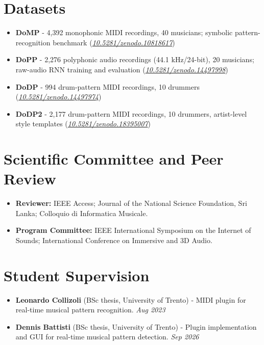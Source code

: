 \documentclass[11pt]{article}
\begin{document}
\section*{Datasets }
\begin{itemize}[leftmargin=1.2em, itemsep=-0.25em]
    \item \textbf{DoMP} - 4,392 monophonic MIDI recordings, 40 musicians; symbolic pattern-recognition benchmark (\href{https://doi.org/10.5281/zenodo.10818617}{\textit{10.5281/zenodo.10818617}})
    \item \textbf{DoPP} - 2,276 polyphonic audio recordings (44.1 kHz/24-bit), 20 musicians; raw-audio RNN training and evaluation (\href{https://doi.org/10.5281/zenodo.14497998}{\textit{10.5281/zenodo.14497998}})
    \item \textbf{DoDP} - 994 drum-pattern MIDI recordings, 10 drummers (\href{https://doi.org/10.5281/zenodo.14497974}{\textit{10.5281/zenodo.14497974}})
    \item \textbf{DoDP2} - 2,177 drum-pattern MIDI recordings, 10 drummers, artist-level style templates (\href{https://doi.org/10.5281/zenodo.18395007}{\textit{10.5281/zenodo.18395007}})
\end{itemize}

\section*{Scientific Committee and Peer Review}
\begin{itemize}[leftmargin=1.2em, itemsep=-0.25em]
    \item \textbf{Reviewer:} IEEE Access; Journal of the National Science Foundation, Sri Lanka; Colloquio di Informatica Musicale.
    \item \textbf{Program Committee:} IEEE International Symposium on the Internet of Sounds; International Conference on Immersive and 3D Audio.
\end{itemize}


\section*{Student Supervision}
\begin{itemize}[leftmargin=1.2em, itemsep=-0.25em]
    \item \textbf{Leonardo Collizoli} (BSc thesis, University of Trento) - MIDI plugin for real-time musical pattern recognition. \hfill \textit{Aug 2023}
    \item \textbf{Dennis Battisti} (BSc thesis, University of Trento) - Plugin implementation and GUI for real-time musical pattern detection. \hfill \textit{Sep 2026}
\end{itemize}
\end{document}
